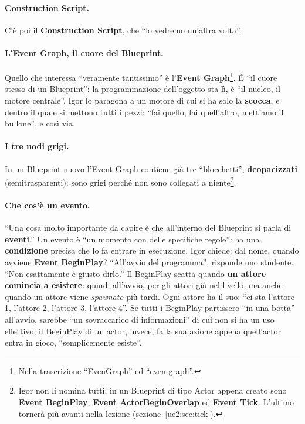\paragraph{Construction Script.} C'è poi il \textbf{Construction Script}, che ``lo
vedremo un'altra volta''.

\paragraph{L'Event Graph, il cuore del Blueprint.} Quello che interessa ``veramente
tantissimo'' è l'\textbf{Event Graph}\footnote{Nella trascrizione ``EvenGraph'' ed
``even graph''.}. È ``il cuore stesso di un Blueprint'': la programmazione dell'oggetto
sta lì, è ``il nucleo, il motore centrale''. Igor lo paragona a un motore di cui si ha
solo la \textbf{scocca}, e dentro il quale si mettono tutti i pezzi: ``fai quello, fai
quell'altro, mettiamo il bullone'', e così via.

\paragraph{I tre nodi grigi.} In un Blueprint nuovo l'Event Graph contiene già tre
``blocchetti'', \textbf{deopacizzati} (semitrasparenti): sono grigi perché non sono
collegati a niente\footnote{Igor non li nomina tutti; in un Blueprint di tipo Actor
appena creato sono \textbf{Event BeginPlay}, \textbf{Event ActorBeginOverlap} ed
\textbf{Event Tick}. L'ultimo tornerà più avanti nella lezione
(sezione~\ref{ue2:sec:tick}).}.

\paragraph{Che cos'è un evento.} ``Una cosa molto importante da capire è che all'interno
del Blueprint si parla di \textbf{eventi}.'' Un evento è ``un momento con delle
specifiche regole'': ha una \textbf{condizione} precisa che lo fa entrare in esecuzione.
Igor chiede: dal nome, quando avviene \textbf{Event BeginPlay}? ``All'avvio del
programma'', risponde uno studente. ``Non esattamente è giusto dirlo.'' Il BeginPlay
scatta quando \textbf{un attore comincia a esistere}: quindi all'avvio, per gli attori già
nel livello, ma anche quando un attore viene \emph{spawnato} più tardi. Ogni attore ha
il suo: ``ci sta l'attore 1, l'attore 2, l'attore 3, l'attore 4''. Se tutti i BeginPlay
partissero ``in una botta'' all'avvio, sarebbe ``un sovraccarico di informazioni'' di cui
non si ha un uso effettivo; il BeginPlay di un actor, invece, fa la sua azione appena
quell'actor entra in gioco, ``semplicemente esiste''.

